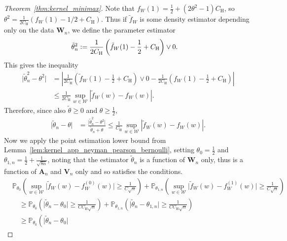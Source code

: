 \documentclass[11pt,lof]{puthesis}
\renewcommand{\P}{\ensuremath{\mathbb{P}}}
\newcommand{\rH}{\ensuremath{\mathrm{H}}}
\newcommand{\bW}{\ensuremath{\mathbf{W}}}
\newcommand{\bA}{\ensuremath{\mathbf{A}}}
\newcommand{\bV}{\ensuremath{\mathbf{V}}}
\newcommand{\cW}{\ensuremath{\mathcal{W}}}
\theoremstyle{break}
\theoremstyle{proof}
\newtheorem{proof}{Proof}
\begin{document}
\begin{proof}[Theorem~\ref{thm:kernel_minimax}]
  Note that $f_W(1) = \frac{1}{2} + (2\theta^2 - 1) C_\rH $,
  so $\theta^2 = \frac{1}{2 C_\rH}(f_W(1) - 1/2 + C_\rH)$.
  Thus if $\tilde f_W$ is some density estimator
  depending only on the data $\bW_n$,
  we define the parameter estimator
  \begin{align*}
    \tilde \theta_n^2
    &\vcentcolon=
    \frac{1}{2 C_\rH}\left(
      \tilde f_W(1) - \frac{1}{2} + C_\rH
    \right)
    \vee 0.
  \end{align*}
  This gives the inequality
  \begin{align*}
    \big|
    \tilde \theta_n^2 - \theta^2
    \big|
    &=
    \left|
    \frac{1}{2 C_\rH}\left(
      \tilde f_W(1) - \frac{1}{2} + C_\rH
    \right)
    \vee 0
    -
    \frac{1}{2 C_\rH}\left(
      f_W(1) - \frac{1}{2} + C_\rH
    \right)
    \right| \\
    &\leq
    \frac{1}{2 C_\rH}
    \sup_{w \in \cW}
    \left|
    \tilde f_W(w) - f_W(w)
    \right|.
  \end{align*}
  Therefore, since also $\tilde \theta \geq 0$
  and $\theta \geq \frac{1}{2}$,
  \begin{align*}
    \big|
    \tilde \theta_n - \theta
    \big|
    &=
    \frac{\big|\tilde \theta_n^2 - \theta^2\big|}
    {\tilde \theta_n + \theta}
    \leq
    \frac{1}{C_\rH}
    \sup_{w \in \cW}
    \left|
    \tilde f_W(w) - f_W(w)
    \right|.
  \end{align*}
  Now we apply the point estimation lower bound from
  Lemma~\ref{lem:kernel_app_neyman_pearson_bernoulli},
  setting $\theta_0 = \frac{1}{2}$
  and $\theta_{1,n} = \frac{1}{2} + \frac{1}{\sqrt{8n}}$,
  noting that the estimator
  $\tilde \theta_n$
  is a function of $\bW_n$ only,
  thus is a function of $\bA_n$ and
  $\bV_n$ only and so satisfies the conditions.
  \begin{align*}
    &\P_{\theta_0} \left(
      \sup_{w \in \cW} \big| \tilde f_W(w) - f^{(0)}_W(w) \big|
      \geq \frac{1}{C\sqrt{n}}
    \right)
    + \P_{\theta_{1,n}} \left(
      \sup_{w \in \cW} \big| \tilde f_W(w) - f^{(1)}_W(w) \big|
      \geq \frac{1}{C\sqrt{n}}
    \right) \\
    &\quad\geq
    \P_{\theta_0} \left(
      \big| \tilde \theta_n - \theta_0 \big|
      \geq \frac{1}{C C_\rH \sqrt{n}}
    \right)
    + \P_{\theta_{1,n}} \left(
      \big| \tilde \theta_n - \theta_{1,n} \big|
      \geq \frac{1}{C C_\rH \sqrt{n}}
    \right) \\
    &\quad\geq
    \P_{\theta_0} \left(
      \big| \tilde \theta_n - \theta_0 \big|

\end{align*}
\end{proof}
\end{document}

